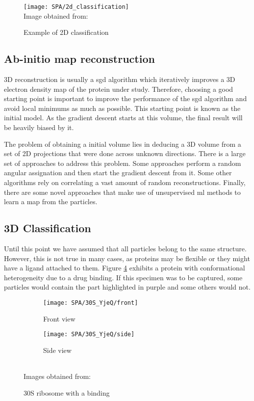 \documentclass[../main.tex]{subfiles}
\begin{document}
\begin{figure}[htbp]
    \centering
    \texttt{[image: SPA/2d\_classification]}\\
    Image obtained from: \cite{greg}
    \caption{Example of 2D classification}
    \label{fig:2:2d_classification}
\end{figure}

\subsection{Ab-initio map reconstruction}
3D reconstruction is usually a \gls{sgd} algorithm which iteratively improves a 3D electron density map of the protein under study. Therefore, choosing a good starting point is important to improve the performance of the \gls{sgd} algorithm and avoid local minimums as much as possible. This starting point is known as the initial model. As the gradient descent starts at this volume, the final result will be heavily biased by it\cite{sigworth2015}.

The problem of obtaining a initial volume lies in deducing a 3D volume from a set of 2D projections that were done across unknown directions. There is a large set of approaches to address this problem. Some approaches perform a random angular assignation and then start the gradient descent from it. Some other algorithms rely on correlating a vast amount of random reconstructions\cite{vargas2014}. Finally, there are some novel approaches that make use of unsupervised \gls{ml} methods to learn a map from the particles\cite{levy2022}.

\subsection{3D Classification}
Until this point we have assumed that all particles belong to the same structure. However, this is not true in many cases, as proteins may be flexible or they might have a ligand attached to them. Figure \ref{fig:2:30s_yjeq} exhibits a protein with conformational heterogeneity due to a drug binding. If this specimen was to be captured, some particles would contain the part highlighted in purple and some others would not.

\begin{figure}[htbp]
    \centering
    \begin{subfigure}[b]{0.3\textwidth}
         \centering
         \texttt{[image: SPA/30S\_YjeQ/front]}
         \caption{Front view}
         \label{fig:2:30s_yjeq:front}
    \end{subfigure}
    \begin{subfigure}[b]{0.3\textwidth}
         \centering
         \texttt{[image: SPA/30S\_YjeQ/side]}
         \caption{Side view}
         \label{fig:2:30s_yjeq:side}
    \end{subfigure}\\
    Images obtained from: \cite{razi2017}
    \caption{30S ribosome with a binding}
    \label{fig:2:30s_yjeq}
\end{figure}
\end{document}
